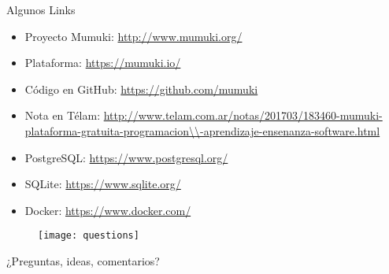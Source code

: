 \documentclass{beamer}
\begin{document}
\begin{frame}{Algunos Links}
    \begin{itemize}%
        \setlength\itemsep{.7em}
        \item Proyecto Mumuki: \url{http://www.mumuki.org/}
        \item Plataforma: \url{https://mumuki.io/}
        \item Código en GitHub: \url{https://github.com/mumuki}
        \item Nota en Télam: \url{http://www.telam.com.ar/notas/201703/183460-mumuki-plataforma-gratuita-programacion\\-aprendizaje-ensenanza-software.html}
        \item PostgreSQL: \url{https://www.postgresql.org/}
        \item SQLite: \url{https://www.sqlite.org/}
        \item Docker: \url{https://www.docker.com/}
    \end{itemize}
\end{frame}


\begin{frame}[plain]
    \begin{center}
        \begin{figure}[h]
            \texttt{[image: questions]}
        \end{figure}
        \vspace{2em}
        \Large{¿Preguntas, ideas, comentarios?}
    \end{center}
\end{frame}
\end{document}
